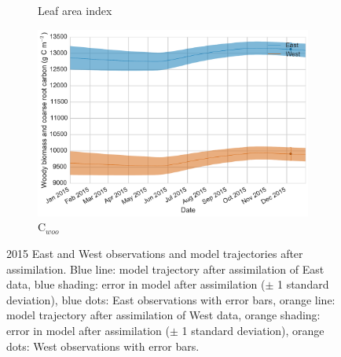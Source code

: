 \documentclass[11pt]{article}
\begin{document}
\begin{figure}[ht]
\begin{subfigure}[b]{0.49\textwidth}
        \caption{Leaf area index}
        \label{fig:lai}
    \end{subfigure}
    \begin{subfigure}[b]{0.49\textwidth}
        \includegraphics[width=\textwidth]{c_woo.pdf}
        \caption{C\(_{woo}\)}
        \label{fig:c_woo}
    \end{subfigure}
    \caption{2015 East and West observations and model trajectories after assimilation. Blue line: model trajectory after assimilation of East data, blue shading: error in model after assimilation (\(\pm\) 1 standard deviation), blue dots: East observations with error bars, orange line: model trajectory after assimilation of West data, orange shading: error in model after assimilation (\(\pm\) 1 standard deviation), orange dots: West observations with error bars.} \label{fig:nee_day}
\end{figure}
\end{document}

